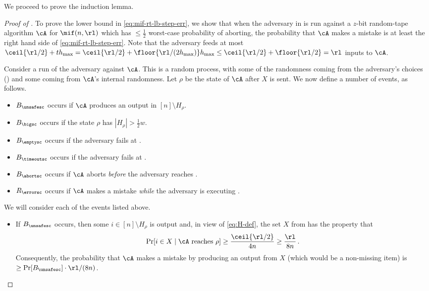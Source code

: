 \begin{itemize}
\begin{itemize}
We proceed to prove the induction lemma.

\begin{proof}[Proof of ]
  To prove the lower bound in \cref{eq:mif-rt-lb-step-err}, we show that when
  the adversary in  is run against a $z$-bit
  random-tape algorithm $\cA$ for $\mif(n,\rl)$ which has $\le \frac{1}{2}$
  worst-case probability of aborting, the probability that $\cA$ makes a
  mistake is at least the right hand side of \cref{eq:mif-rt-lb-step-err}.
  Note that the adversary feeds at most $\ceil{\rl/2} + t h_{\max} =
  \ceil{\rl/2} + \floor{\rl/ (2 h_{\max})} h_{\max} \le \ceil{\rl/2} +
  \floor{\rl/2} = \rl$ inputs to $\cA$.
  
  Consider a run of the adversary against $\cA$. This is a random process,
  with some of the randomness coming from the adversary's choices
  () and some coming from $\cA$'s internal randomness.
  Let $\rho$ be the state of $\cA$ after $X$ is sent. We now define a number
  of events, as follows.
  \begin{itemize}
    \item $B_{\unsafesc}$ occurs if $\cA$ produces an output in $[n] \setminus H_\rho$.
    \item $B_{\bigsc}$ occurs if the state $\rho$ has $|H_\rho| > \frac{1}{2} w$.
    \item $B_{\emptysc}$ occurs if the adversary fails at .
    \item $B_{\timeoutsc}$ occurs if the adversary fails at .
    \item $B_{\abortsc}$ occurs if $\cA$ aborts \emph{before} the adversary reaches .
    \item $R_{\errorsc}$ occurs if $\cA$ makes a mistake \emph{while} the adversary is executing .
  \end{itemize}
  
  We will consider each of the events listed above.
  \iflipics\begin{itemize}\else
  \begin{itemize}[wide, font=\bfseries]\fi
  \item[(Event $B_{\unsafesc}$)~] 
    If $B_{\unsafesc}$ occurs, then some $i \in [n] \setminus H_\rho$ is
    output and, in view of \cref{eq:H-def}, the set $X$ from
     has the property that
    \[
      \Pr[i \in X \mid \cA \text{ reaches } \rho] \ge \frac{\ceil{\rl/2}}{4n}
      \ge \frac{\rl}{8n} \,.
    \]
    Consequently, the probability that $\cA$ makes a mistake by producing an
    output from $X$ (which would be a non-missing item) is $\ge
    \Pr[B_{\unsafesc}] \cdot \rl/(8 n)$. 


\end{itemize}
\end{itemize}
\end{proof}
\end{itemize}
\end{itemize}
